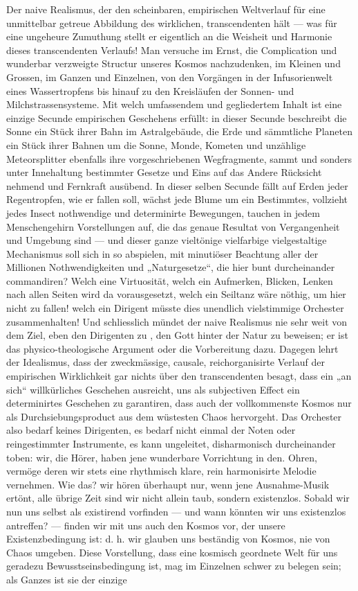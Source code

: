 Der naive Realismus, der den scheinbaren, empirischen Weltverlauf für eine unmittelbar getreue Abbildung des wirklichen, transcendenten hält — was für eine ungeheure Zumuthung stellt er eigentlich an die Weisheit und Harmonie dieses transcendenten Verlaufs! Man versuche im Ernst, die Complication und wunderbar verzweigte Structur unseres Kosmos nachzudenken, im Kleinen und Grossen, im Ganzen und Einzelnen, von den Vorgängen in der Infusorienwelt eines Wassertropfens bis hinauf zu den Kreisläufen der Sonnen- und Milchstrassensysteme. Mit welch umfassendem und gegliedertem Inhalt ist eine einzige Secunde empirischen Geschehens erfüllt: in dieser Secunde beschreibt die Sonne ein Stück ihrer Bahn im Astralgebäude, die Erde und sämmtliche Planeten ein Stück ihrer Bahnen um die Sonne, Monde, Kometen und unzählige Meteorsplitter ebenfalls ihre vorgeschriebenen Wegfragmente, sammt und sonders unter Innehaltung bestimmter Gesetze und Eins auf das Andere Rücksicht nehmend und Fernkraft ausübend. In dieser selben Secunde fällt auf Erden jeder Regentropfen, wie er fallen soll, wächst jede Blume um ein Bestimmtes, vollzieht jedes Insect nothwendige und determinirte Bewegungen, tauchen in jedem Menschengehirn Vorstellungen auf, die das genaue Resultat von Vergangenheit und Umgebung sind — und dieser ganze vieltönige vielfarbige vielgestaltige Mechanismus soll sich in  so abspielen, mit minutiöser Beachtung aller der Millionen Nothwendigkeiten und „Naturgesetze“, die hier bunt durcheinander commandiren? Welch eine Virtuosität, welch ein Aufmerken, Blicken, Lenken nach allen Seiten wird da vorausgesetzt, welch ein Seiltanz wäre nöthig, um hier nicht zu fallen! welch ein Dirigent müsste dies unendlich vielstimmige Orchester zusammenhalten! Und schliesslich mündet der naive Realismus nie sehr weit von dem Ziel, eben den Dirigenten zu , den Gott hinter der Natur zu beweisen; er ist das physico-theologische Argument oder die Vorbereitung dazu. Dagegen lehrt der Idealismus, dass der zweckmässige, causale, reichorganisirte Verlauf der empirischen Wirklichkeit gar nichts über den transcendenten besagt, dass ein „an sich“ willkürliches Geschehen ausreicht, uns als subjectiven Effect ein determinirtes Geschehen zu garantiren, dass auch der vollkommenste Kosmos nur als Durchsiebungsproduct aus dem wüstesten Chaos hervorgeht. Das Orchester also bedarf keines Dirigenten, es bedarf nicht einmal der Noten oder reingestimmter Instrumente, es kann ungeleitet, disharmonisch durcheinander toben: wir, die Hörer, haben jene wunderbare Vorrichtung in den. Ohren, vermöge deren wir stets eine rhythmisch klare, rein harmonisirte Melodie vernehmen. Wie das? wir hören überhaupt nur, wenn jene  Ausnahme-Musik ertönt, alle übrige Zeit sind wir nicht allein taub, sondern existenzlos. Sobald wir nun uns selbst als existirend vorfinden — und wann könnten wir uns existenzlos antreffen? — finden wir mit uns auch den Kosmos vor, der unsere Existenzbedingung ist: d. h. wir glauben uns beständig von Kosmos, nie von Chaos umgeben. Diese Vorstellung, dass eine kosmisch geordnete Welt für uns geradezu Bewusstseinsbedingung ist, mag im Einzelnen schwer zu belegen sein; als Ganzes ist sie der einzige 